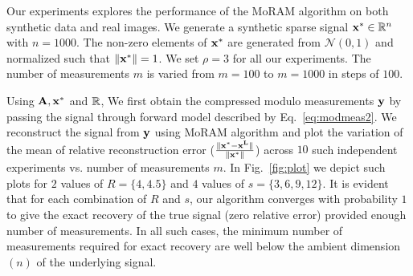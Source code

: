 Our experiments explores the performance of the MoRAM algorithm on both synthetic data and real images. We generate a synthetic sparse signal $\mathbf{x^*} \in {\mathbb{R}}^n$ with $n=1000$. The non-zero elements of $\mathbf{x^*}$ are generated from $\mathcal{N}(0,1)$ and normalized such that $\|\mathbf{x^*}\| =1$. We set $\rho=3$ for all our experiments. The number of measurements $m$ is varied from $m = 100$ to $m=1000$ in steps of $100$. 


Using $\mathbf{A, x^*}$ and ${\mathbb{R}}$, We first obtain the compressed modulo measurements $\mathbf{y}$ by passing the signal through forward model described by Eq.~\ref{eq:modmeas2}. We reconstruct the signal from $\mathbf{y}$ using MoRAM algorithm and plot the variation of the mean of relative reconstruction error ($\frac{\|\mathbf{x^*-x^L}\|}{\|\mathbf{x^*}\|}$) across $10$ such independent experiments vs. number of measurements $m$. In Fig.~\ref{fig:plot} we depict such plots for $2$ values of $R=\{4,4.5\}$ and $4$ values of $s=\{3,6,9,12\}$. It is evident that for each combination of $R$ and $s$, our algorithm converges with probability $1$ to give the exact recovery of the true signal (zero relative error) provided enough number of measurements. In all such cases, the minimum number of measurements required for exact recovery are well below the ambient dimension $(n)$ of the underlying signal. 

